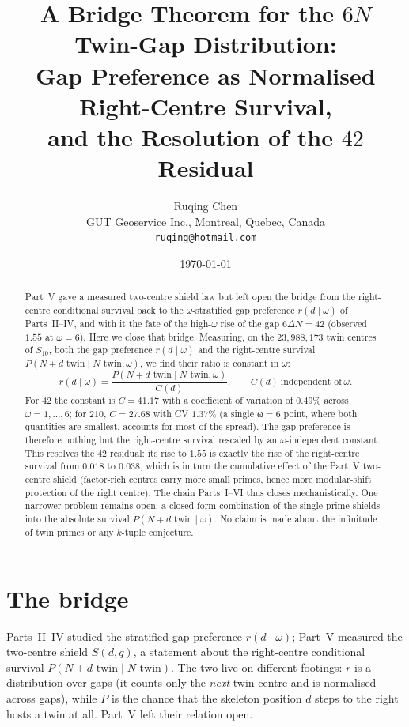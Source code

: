 \documentclass[11pt]{article}
\title{A Bridge Theorem for the $6N$ Twin-Gap Distribution:\\
Gap Preference as Normalised Right-Centre Survival,\\
and the Resolution of the $42$ Residual}
\author{Ruqing Chen\\
\small GUT Geoservice Inc., Montreal, Quebec, Canada\\
\small \texttt{ruqing@hotmail.com}}
\date{\today}
\begin{document}
\maketitle

\begin{abstract}
Part~V gave a measured two-centre shield law but left open the bridge from the
right-centre conditional survival back to the $\omega$-stratified gap preference
$r(d\mid\omega)$ of Parts~II--IV, and with it the fate of the high-$\omega$ rise
of the gap $6\Delta N=42$ (observed $1.55$ at $\omega=6$). Here we close that
bridge. Measuring, on the $23{,}988{,}173$ twin centres of $S_{10}$, both the gap
preference $r(d\mid\omega)$ and the right-centre survival
$P(N{+}d\text{ twin}\mid N\text{ twin},\omega)$, we find their ratio is
constant in $\omega$:
\[
  r(d\mid\omega)=\frac{P(N{+}d\text{ twin}\mid N\text{ twin},\omega)}{C(d)},
  \qquad C(d)\ \text{independent of}\ \omega .
\]
For $42$ the constant is $C=41.17$ with a coefficient of variation of $0.49\%$
across $\omega=1,\dots,6$; for $210$, $C=27.68$ with CV $1.37\%$ (a single
ω$=6$ point, where both quantities are smallest, accounts for most of the
spread). The gap preference is therefore nothing but the right-centre survival
rescaled by an $\omega$-independent constant. This resolves the $42$ residual: its
rise to $1.55$ is exactly the rise of the right-centre survival from $0.018$ to
$0.038$, which is in turn the cumulative effect of the Part~V two-centre shield
(factor-rich centres carry more small primes, hence more modular-shift
protection of the right centre). The chain Parts~I--VI thus closes mechanistically.
One narrower problem remains open: a closed-form combination of the single-prime
shields into the absolute survival $P(N{+}d\text{ twin}\mid\omega)$. No claim is
made about the infinitude of twin primes or any $k$-tuple conjecture.
\end{abstract}

\section{The bridge}

Parts~II--IV studied the stratified gap preference $r(d\mid\omega)$; Part~V
measured the two-centre shield $S(d,q)$, a statement about the right-centre
conditional survival $P(N{+}d\text{ twin}\mid N\text{ twin})$. The two live on
different footings: $r$ is a distribution over gaps (it counts only the
\emph{next} twin centre and is normalised across gaps), while $P$ is the chance
that the skeleton position $d$ steps to the right hosts a twin at all. Part~V left
their relation open.
\end{document}
